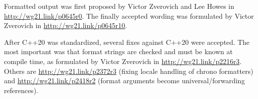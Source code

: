 Formatted output was first proposed by Victor Zverovich and Lee Howes in \url{http://wg21.link/p0645r0}.
The finally accepted wording was formulated by Victor Zverovich in \url{http://wg21.link/p0645r10}.

After C++20 was standardized, several fixes against C++20 were accepted. The most important was that format strings are checked and must be known at compile time, as formulated by Victor Zverovich in \url{http://wg21.link/p2216r3}. Others are \url{http://wg21.link/p2372r3} (fixing locale handling of chrono formatters) and \url{http://wg21.link/p2418r2} (format arguments become universal/forwarding references).